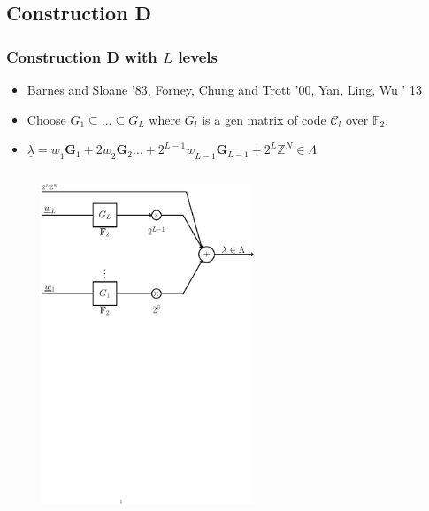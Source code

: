 \documentclass[10pt]{beamer}
\newcommand{\mc}{\mathcal}
\begin{document}
\subsection{Construction D}
\begin{frame}\frametitle{Construction D with $L$ levels}
\begin{itemize}
    \item Barnes and Sloane '83, Forney, Chung and Trott '00, Yan, Ling, Wu ' 13
				 \vspace{0.5em}
	 \item Choose  $G_{1}\subseteq \ldots \subseteq G_{L}$ where $G_{l}$ is a gen matrix of code $\mc{C}_{l}$ over $\mathbb{F}_{2}$.
				 \vspace{.5em}
	\item<2->  $  \underline{\lambda} = \underline{w}_1 \mathbf{G}_1 + 2 \underline{w}_2 \mathbf{G}_2 \ldots +2^{L-1} \underline{w}_{L-1} \mathbf{G}_{L-1} +2^{L}\mathbb{Z}^{N} \in \Lambda$
\end{itemize}
				\vspace{0.2in}
    \begin{columns}[t]      
 	      \begin{column}{0.6\textwidth}
            \begin{figure}
				{\includegraphics[width=2.5in]{lattice_Constr_D1}}
            \end{figure}
        \end{column}


\end{columns}
\end{frame}
\end{document}
